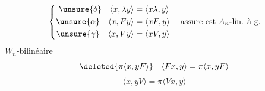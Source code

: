\[
\left\{\begin{aligned}
\unsure{\delta}\quad\langle x,\lambda y\rangle&=\langle x\lambda,y\rangle\\
\unsure{\alpha}\quad\langle x,Fy\rangle&=\langle xF,y\rangle\\
\unsure{\gamma}\quad\langle x,Vy\rangle&=\langle xV,y\rangle
\end{aligned}\right.\quad\text{assure est }A_n\text{-lin. à g.}
\]
\quad{}\quad{}
$W_n$-bilinéaire
\[
\deleted{\pi\langle x,yF\rangle}\quad\langle Fx,y\rangle=\pi\langle x,yF\rangle
\]
\[
\langle x,yV\rangle=\pi\langle Vx,y\rangle
\]
